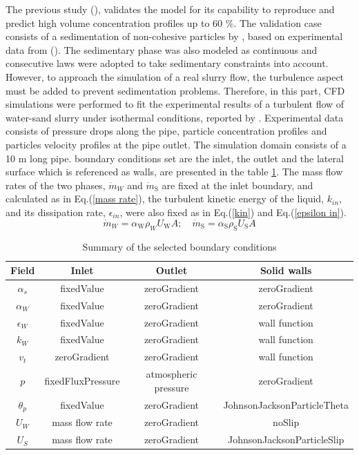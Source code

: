 \documentclass[11pt]{report}
\begin{document}
%
The previous study (\citet{elkarii2020towards}), validates the model for its capability to reproduce and predict high volume concentration profiles up to 60 $\%$. 
%
The validation case consists of a sedimentation of non-cohesive particles by \citet{chauchat}, based on experimental data from (\citet{Pha-2008}). 
%
The sedimentary phase was also modeled as continuous and consecutive laws were adopted to take sedimentary constraints into account.
%
 However, to approach the simulation of a real slurry flow, the turbulence aspect must be added to prevent sedimentation problems. 
 Therefore, in this part, CFD simulations were performed to fit the experimental results of a turbulent flow of water-sand slurry under isothermal conditions, reported by \citet{Randal-2004}. 
 Experimental data consists of pressure drops along the pipe, particle concentration profiles and particles velocity profiles at the pipe outlet. 
 The simulation domain consists of a 10 m long pipe. boundary conditions set are the inlet, the outlet and the lateral surface which is referenced as walls, are presented in the table \ref{tab:bc}. 
 The mass flow rates of the two phases, \(\dot{m}_{W}\) and \(\dot{m}_{\mathrm{S}}\) are fixed at the inlet boundary, and calculated as in Eq.(\ref{mass rate}), the turbulent kinetic energy of the liquid, \(k_{in}\), 
 and its dissipation rate, \(\epsilon_{in }\), were also fixed as in Eq.(\ref{kin}) and Eq.(\ref{epsilon in}). 
\begin{equation}
 \dot{m}_{W}= \alpha_{\mathrm{W}} \rho_{W} U_{\mathrm{W}} A;\quad \dot{m}_{\mathrm{S}}= \alpha_{\mathrm{S}} \rho_{\mathrm{S}} U_{\mathrm{S}} A
 \label{mass rate}
 \end{equation}
%
 \begin{table}[ht!]
 \begin{center}
 \caption{Summary of the selected boundary conditions}
 \label{tab:bc}
 \begin{tabular}{cccc}
 \hline Field & Inlet & Outlet & Solid walls  \\
 \hline\(\alpha_{s}\) & fixedValue & zeroGradient & zeroGradient \\
 \(\alpha_{W}\) & fixedValue & zeroGradient & zeroGradient \\
 \(\epsilon_{W}\) & fixedValue & zeroGradient & wall function\\
 \(k_{W}\) & fixedValue & zeroGradient & wall function \\
 \(v_{t}\) & zeroGradient & zeroGradient &  wall function \\
 \(p\) & fixedFluxPressure & atmospheric pressure & zeroGradient \\
 \(\theta_{p}\) & fixedValue & zeroGradient & JohnsonJacksonParticleTheta\\
 \(U_{W}\) & mass flow rate  & zeroGradient & noSlip\\
 \(U_{S}\) & mass flow rate  & zeroGradient & JohnsonJacksonParticleSlip  \\
 \hline
 \end{tabular}
 \end{center}
 \end{table}
\end{document}
